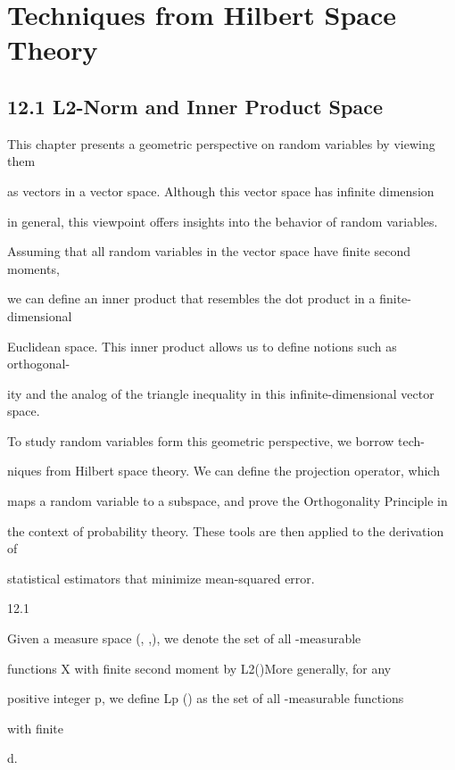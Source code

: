 \section*{Techniques from Hilbert Space Theory}

\subsection*{12.1 L2-Norm and Inner Product Space}

This chapter presents a geometric perspective on random variables by viewing them

as vectors in a vector space. Although this vector space has infinite dimension

in general, this viewpoint offers insights into the behavior of random variables.

Assuming that all random variables in the vector space have finite second moments,

we can define an inner product that resembles the dot product in a finite-dimensional

Euclidean space. This inner product allows us to define notions such as orthogonal-

ity and the analog of the triangle inequality in this infinite-dimensional vector space.

To study random variables form this geometric perspective, we borrow tech-

niques from Hilbert space theory. We can define the projection operator, which

maps a random variable to a subspace, and prove the Orthogonality Principle in

the context of probability theory. These tools are then applied to the derivation of

statistical estimators that minimize mean-squared error.

\begin{defbox}{12.1}
\end{defbox}

Given a measure space (\Omega, ,\mu ), we denote the set of all -measurable

functions X with finite second moment by L2(\mu)More generally, for any

positive integer p, we define Lp (\mu) as the set of all -measurable functions

with finite

\int

\vertX\vertp d\mu.

